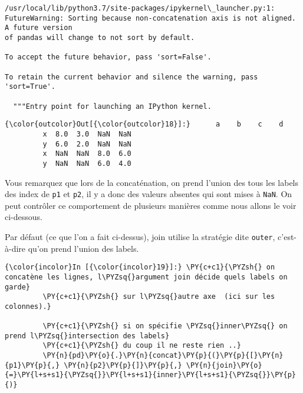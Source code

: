     \begin{Verbatim}[commandchars=\\\{\},frame=single,framerule=0.3mm,rulecolor=\color{cellframecolor}]
/usr/local/lib/python3.7/site-packages/ipykernel\_launcher.py:1: FutureWarning: Sorting because non-concatenation axis is not aligned. A future version
of pandas will change to not sort by default.

To accept the future behavior, pass 'sort=False'.

To retain the current behavior and silence the warning, pass 'sort=True'.

  """Entry point for launching an IPython kernel.
\end{Verbatim}

\begin{Verbatim}[commandchars=\\\{\},frame=single,framerule=0.3mm,rulecolor=\color{cellframecolor}]
{\color{outcolor}Out[{\color{outcolor}18}]:}      a    b    c    d
         x  8.0  3.0  NaN  NaN
         y  6.0  2.0  NaN  NaN
         x  NaN  NaN  8.0  6.0
         y  NaN  NaN  6.0  4.0
\end{Verbatim}
            
    Vous remarquez que lors de la concaténation, on prend l'union des tous
les labels des index de \texttt{p1} et \texttt{p2}, il y a donc des
valeurs absentes qui sont mises à \texttt{NaN}. On peut contrôler ce
comportement de plusieurs manières comme nous allons le voir ci-dessous.

    Par défaut (ce que l'on a fait ci-dessus), join utilise la stratégie
dite \texttt{outer}, c'est-à-dire qu'on prend l'union des labels.

    \begin{Verbatim}[commandchars=\\\{\},frame=single,framerule=0.3mm,rulecolor=\color{cellframecolor}]
{\color{incolor}In [{\color{incolor}19}]:} \PY{c+c1}{\PYZsh{} on concatène les lignes, l\PYZsq{}argument join décide quels labels on garde}
         \PY{c+c1}{\PYZsh{} sur l\PYZsq{}autre axe  (ici sur les colonnes).}
         
         \PY{c+c1}{\PYZsh{} si on spécifie \PYZsq{}inner\PYZsq{} on prend l\PYZsq{}intersection des labels}
         \PY{c+c1}{\PYZsh{} du coup il ne reste rien ..}
         \PY{n}{pd}\PY{o}{.}\PY{n}{concat}\PY{p}{(}\PY{p}{[}\PY{n}{p1}\PY{p}{,} \PY{n}{p2}\PY{p}{]}\PY{p}{,} \PY{n}{join}\PY{o}{=}\PY{l+s+s1}{\PYZsq{}}\PY{l+s+s1}{inner}\PY{l+s+s1}{\PYZsq{}}\PY{p}{)}
\end{Verbatim}


